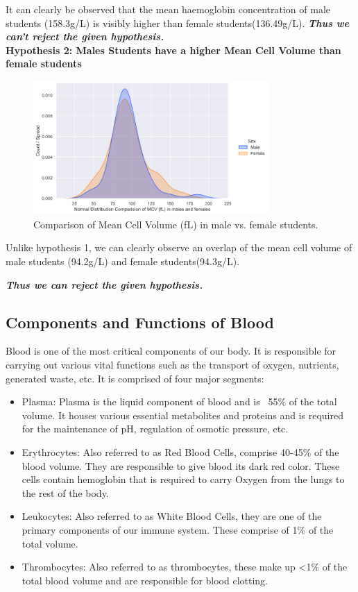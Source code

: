 \documentclass[pdflatex,sn-mathphys]{sn-jnl}%
\theoremstyle{thmstyleone}%
\theoremstyle{thmstyletwo}%
\theoremstyle{thmstylethree}%
\begin{document}
It can clearly be observed that the mean haemoglobin concentration of male students (158.3g/L) is visibly higher than female students(136.49g/L). \textbf{\textit{Thus we can't reject the given hypothesis.}}
\\

\noindent\textbf{Hypothesis 2: Males Students have a higher Mean Cell Volume than female students}
\begin{figure}[h!]
\centering
\includegraphics[width=0.8\textwidth]{photos/hyp_2.png}
\caption{Comparison of Mean Cell Volume (fL) in male vs. female students. }\label{fig1}
\end{figure}

Unlike hypothesis 1, we can clearly observe an overlap of the mean cell volume of male students (94.2g/L) and female students(94.3g/L). 

\textbf{\textit{Thus we can reject the given hypothesis.}}
\subsection{Components and Functions of Blood}
Blood is one of the most critical components of our body. It is responsible for carrying out various vital functions such as the transport of oxygen, nutrients, generated waste, etc. It is comprised of four major segments:
\begin{itemize}
    \item Plasma: Plasma is the liquid component of blood and is ~55\% of the total volume. It houses various essential metabolites and proteins and is required for the maintenance of pH, regulation of osmotic pressure, etc.
    \item Erythrocytes: Also referred to as Red Blood Cells, comprise 40-45\% of the blood volume. They are responsible to give blood its dark red color. These cells contain hemoglobin that is required to carry Oxygen from the lungs to the rest of the body.
    \item  Leukocytes: Also referred to as White Blood Cells, they are one of the primary components of our immune system. These comprise of 1\% of the total volume.
    \item Thrombocytes: Also referred to as thrombocytes, these make up <1\% of the total blood volume and are responsible for blood clotting.
\end{itemize}
\end{document}
